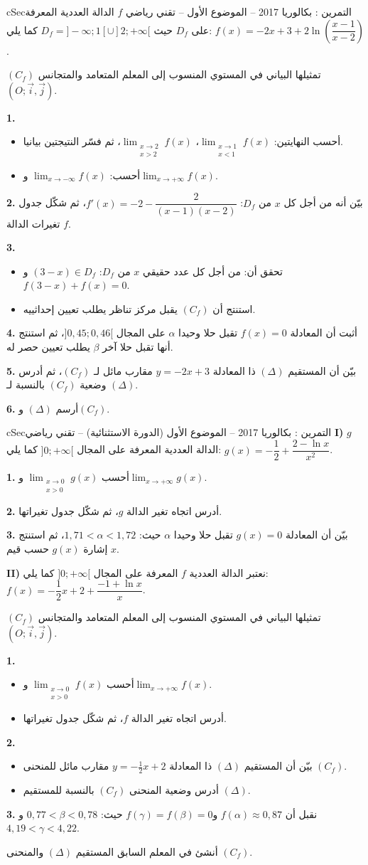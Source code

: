 \documentclass[12pt,a4paper]{article}
\newenvironment{BOX}[2]{\begin{otherlanguage}{english}\begin{arbox}{#1}{#2}}{\end{arbox}\end{otherlanguage}}
\newcounter{exo}
\newenvironment{tamrin}[1]{\stepcounter{exo}\begin{BOX}{cSec}{التمرين \theexo: #1}}{\end{BOX}}
\newenvironment{sq}{\begin{itemize}[leftmargin=2.4em,itemsep=3pt]}{\end{itemize}}
\newcommand{\qa}{\item[(أ)]}\newcommand{\qb}{\item[(ب)]}\newcommand{\qc}{\item[(جـ)]}\newcommand{\qd}{\item[(د)]}\newcommand{\qe}{\item[(هـ)]}
\newcommand{\QQ}[1]{\par\smallskip\textbf{#1.} }
\begin{document}
\begin{tamrin}{بكالوريا 2017 -- الموضوع الأول -- تقني رياضي}
$f$ الدالة العددية المعرفة على $D_f$ حيث $D_f=]-\infty;1[\cup]2;+\infty[$ كما يلي: $f(x)=-2x+3+2\ln\left(\dfrac{x-1}{x-2}\right)$.

$(C_f)$ تمثيلها البياني في المستوي المنسوب إلى المعلم المتعامد والمتجانس $(O;\vec{i},\vec{j})$.
\QQ{1}
\begin{sq}
\qa أحسب النهايتين: $\displaystyle\lim_{\substack{x\to1\\x<1}}f(x)$، $\displaystyle\lim_{\substack{x\to2\\x>2}}f(x)$، ثم فسّر النتيجتين بيانيا.
\qb أحسب: $\displaystyle\lim_{x\to-\infty}f(x)$ و$\displaystyle\lim_{x\to+\infty}f(x)$.
\end{sq}
\QQ{2} بيّن أنه من أجل كل $x$ من $D_f$: $f'(x)=-2-\dfrac{2}{(x-1)(x-2)}$، ثم شكّل جدول تغيرات الدالة $f$.
\QQ{3}
\begin{sq}
\qa تحقق أن: من أجل كل عدد حقيقي $x$ من $D_f$: $(3-x)\in D_f$ و$f(3-x)+f(x)=0$.
\qb استنتج أن $(C_f)$ يقبل مركز تناظر يطلب تعيين إحداثييه.
\end{sq}
\QQ{4} أثبت أن المعادلة $f(x)=0$ تقبل حلا وحيدا $\alpha$ على المجال $]0{,}45;0{,}46[$، ثم استنتج أنها تقبل حلا آخر $\beta$ يطلب تعيين حصر له.
\QQ{5} بيّن أن المستقيم $(\Delta)$ ذا المعادلة $y=-2x+3$ مقارب مائل لـ $(C_f)$، ثم أدرس وضعية $(C_f)$ بالنسبة لـ $(\Delta)$.
\QQ{6} أرسم $(\Delta)$ و$(C_f)$.
\end{tamrin}

\begin{tamrin}{بكالوريا 2017 -- الموضوع الأول (الدورة الاستثنائية) -- تقني رياضي}
\textbf{I)} $g$ الدالة العددية المعرفة على المجال $]0;+\infty[$ كما يلي: $g(x)=-\dfrac12+\dfrac{2-\ln x}{x^2}$.
\QQ{1} أحسب $\displaystyle\lim_{\substack{x\to0\\x>0}}g(x)$ و$\displaystyle\lim_{x\to+\infty}g(x)$.
\QQ{2} أدرس اتجاه تغير الدالة $g$، ثم شكّل جدول تغيراتها.
\QQ{3} بيّن أن المعادلة $g(x)=0$ تقبل حلا وحيدا $\alpha$ حيث: $1{,}71<\alpha<1{,}72$، ثم استنتج إشارة $g(x)$ حسب قيم $x$.

\textbf{II)} نعتبر الدالة العددية $f$ المعرفة على المجال $]0;+\infty[$ كما يلي: $f(x)=-\dfrac12x+2+\dfrac{-1+\ln x}{x}$.

$(C_f)$ تمثيلها البياني في المستوي المنسوب إلى المعلم المتعامد والمتجانس $(O;\vec{i},\vec{j})$.
\QQ{1}
\begin{sq}
\qa أحسب $\displaystyle\lim_{\substack{x\to0\\x>0}}f(x)$ و$\displaystyle\lim_{x\to+\infty}f(x)$.
\qb أدرس اتجاه تغير الدالة $f$، ثم شكّل جدول تغيراتها.
\end{sq}
\QQ{2}
\begin{sq}
\qa بيّن أن المستقيم $(\Delta)$ ذا المعادلة $y=-\frac12x+2$ مقارب مائل للمنحنى $(C_f)$.
\qb أدرس وضعية المنحنى $(C_f)$ بالنسبة للمستقيم $(\Delta)$.
\end{sq}
\QQ{3} نقبل أن $f(\alpha)\approx0{,}87$ و$f(\gamma)=f(\beta)=0$ حيث: $0{,}77<\beta<0{,}78$ و$4{,}19<\gamma<4{,}22$.

أنشئ في المعلم السابق المستقيم $(\Delta)$ والمنحنى $(C_f)$.
\end{tamrin}
\end{document}
